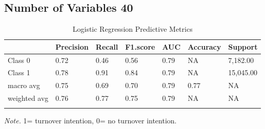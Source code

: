 \documentclass[
  man]{apa7}
\begin{document}
\hypertarget{number-of-variables-40}{%
\subsection{Number of Variables 40}\label{number-of-variables-40}}

\begin{table}[tbp]

\begin{center}
\begin{threeparttable}

\caption{\label{tab:logitable40}Logistic Regression Predictive Metrics}

\begin{tabular}{lllllll}
\toprule
 & \multicolumn{1}{c}{Precision} & \multicolumn{1}{c}{Recall} & \multicolumn{1}{c}{F1.score} & \multicolumn{1}{c}{AUC} & \multicolumn{1}{c}{Accuracy} & \multicolumn{1}{c}{Support}\\
\midrule
Class 0 & 0.72 & 0.46 & 0.56 & 0.79 & NA & 7,182.00\\
Class 1 & 0.78 & 0.91 & 0.84 & 0.79 & NA & 15,045.00\\
macro avg & 0.75 & 0.69 & 0.70 & 0.79 & 0.77 & NA\\
weighted avg & 0.76 & 0.77 & 0.75 & 0.79 & NA & NA\\
\bottomrule
\addlinespace
\end{tabular}

\begin{tablenotes}[para]
\normalsize{\textit{Note.} 1= turnover intention, 0= no turnover intention.}
\end{tablenotes}

\end{threeparttable}
\end{center}

\end{table}
\end{document}
